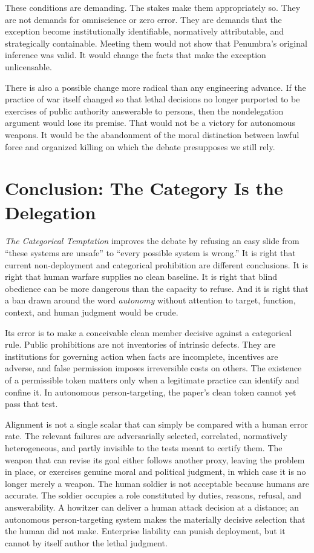 \documentclass[11pt]{article}
\begin{document}
These conditions are demanding. The stakes make them appropriately so. They are not demands for omniscience or zero error. They are demands that the exception become institutionally identifiable, normatively attributable, and strategically containable. Meeting them would not show that Penumbra's original inference was valid. It would change the facts that make the exception unlicensable.

There is also a possible change more radical than any engineering advance. If the practice of war itself changed so that lethal decisions no longer purported to be exercises of public authority answerable to persons, then the nondelegation argument would lose its premise. That would not be a victory for autonomous weapons. It would be the abandonment of the moral distinction between lawful force and organized killing on which the debate presupposes we still rely.

\section{Conclusion: The Category Is the Delegation}
\label{sec:conclusion}

\textit{The Categorical Temptation} improves the debate by refusing an easy slide from ``these systems are unsafe'' to ``every possible system is wrong.'' It is right that current non-deployment and categorical prohibition are different conclusions. It is right that human warfare supplies no clean baseline. It is right that blind obedience can be more dangerous than the capacity to refuse. And it is right that a ban drawn around the word \emph{autonomy} without attention to target, function, context, and human judgment would be crude.

Its error is to make a conceivable clean member decisive against a categorical rule. Public prohibitions are not inventories of intrinsic defects. They are institutions for governing action when facts are incomplete, incentives are adverse, and false permission imposes irreversible costs on others. The existence of a permissible token matters only when a legitimate practice can identify and confine it. In autonomous person-targeting, the paper's clean token cannot yet pass that test.

Alignment is not a single scalar that can simply be compared with a human error rate. The relevant failures are adversarially selected, correlated, normatively heterogeneous, and partly invisible to the tests meant to certify them. The weapon that can revise its goal either follows another proxy, leaving the problem in place, or exercises genuine moral and political judgment, in which case it is no longer merely a weapon. The human soldier is not acceptable because humans are accurate. The soldier occupies a role constituted by duties, reasons, refusal, and answerability. A howitzer can deliver a human attack decision at a distance; an autonomous person-targeting system makes the materially decisive selection that the human did not make. Enterprise liability can punish deployment, but it cannot by itself author the lethal judgment.
\end{document}
